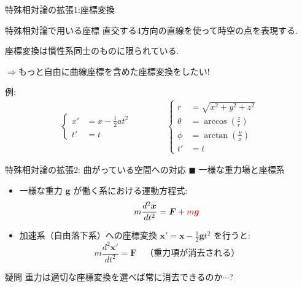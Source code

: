 \documentclass[unicode, aspectratio=169, 12pt]{beamer}
\begin{document}
\begin{frame}{特殊相対論の拡張1:座標変換}
    \begin{block}{特殊相対論で用いる座標}
        直交する4方向の直線を使って時空の点を表現する.

        座標変換は慣性系同士のものに限られている.
    \end{block}

    $\Rightarrow$もっと自由に曲線座標を含めた座標変換をしたい!

    例:
    \begin{align*}
        \left\{
        \begin{aligned}
        x' &= x - \frac{1}{2}at^2\\
        t' &= t
        \end{aligned}
        \right.
        \qquad\qquad
        \left\{
        \begin{aligned}
            r &= \sqrt{x^2 + y^2 + z^2} \\
            \theta &= \arccos\left(\frac{z}{r}\right) \\
            \phi &= \arctan\left(\frac{y}{x}\right)\\
            t' &= t
        \end{aligned}
        \right.
    \end{align*}
\end{frame}

\begin{frame}{特殊相対論の拡張2: 曲がっている空間への対応}
    $\blacksquare$ 一様な重力場と座標系
    \begin{itemize}
        \item 一様な重力 $\bm{g}$ が働く系における運動方程式:
        \begin{equation*}
            m \frac{d^2\bm{x}}{dt^2} = \bm{F} + \textcolor{red}{m\bm{g}}
        \end{equation*}
        \item 加速系（自由落下系）への座標変換 $\bm{x}' = \bm{x} - \frac{1}{2}\bm{g}t^2$ を行うと:
        \begin{equation*}
            m \frac{d^2\bm{x}'}{dt^2} = \bm{F} \quad \text{（重力項が消去される）}
        \end{equation*}
    \end{itemize}
    \begin{alertblock}{疑問}
        \centering
        重力は適切な座標変換を選べば常に消去できるのか$\cdots$?
    \end{alertblock}
\end{frame}
\end{document}
